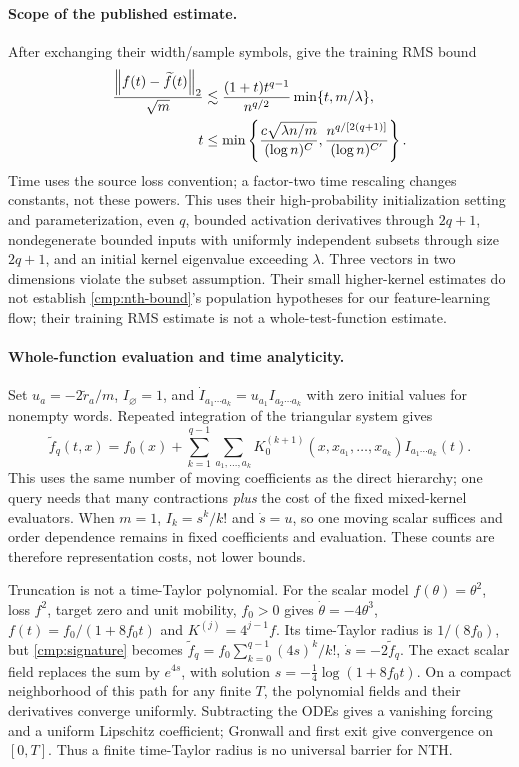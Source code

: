 \paragraph{Scope of the published estimate.}
After exchanging their width/sample symbols, \citet[Theorem~2.6]{huang2020nth}
give the training RMS bound
\begin{align}
 \frac{\left\lVert f(t)-\widetilde f(t)\right\rVert_2}{\sqrt m}
 &\lesssim\frac{(1+t)t^{q-1}}{n^{q/2}}\min\{t,m/\lambda\},\nonumber\\
 t&\le\min\left\{\frac{c\sqrt{\lambda n/m}}{(\log n)^C},
 \frac{n^{q/[2(q+1)]}}{(\log n)^{C'}}\right\}.
\label{cmp:published-nth}
\end{align}
Time uses the source loss convention; a factor-two time rescaling changes
constants, not these powers.
This uses their high-probability initialization setting and parameterization,
even $q$, bounded
activation derivatives through $2q+1$, nondegenerate bounded inputs with
uniformly independent subsets through size $2q+1$, and an initial kernel
eigenvalue exceeding $\lambda$.  Three vectors in two dimensions violate the
subset assumption.  Their small higher-kernel estimates do not establish
\eqref{cmp:nth-bound}'s population hypotheses for our feature-learning flow;
their training RMS estimate is not a whole-test-function estimate.

\paragraph{Whole-function evaluation and time analyticity.}
Set $u_a=-2\widetilde r_a/m$, $I_\varnothing=1$, and
$\dot I_{a_1\cdots a_k}=u_{a_1}I_{a_2\cdots a_k}$ with zero initial values
for nonempty words.  Repeated integration of the triangular system gives
\begin{equation}
 \widetilde f_q(t,x)=f_0(x)+\sum_{k=1}^{q-1}\sum_{a_1,\ldots,a_k}
 K_0^{(k+1)}(x,x_{a_1},\ldots,x_{a_k})I_{a_1\cdots a_k}(t).
 \label{cmp:signature}
\end{equation}
This uses the same number of moving coefficients as the direct hierarchy;
one query needs that many contractions \emph{plus} the cost of the fixed
mixed-kernel evaluators.  When $m=1$, $I_k=s^k/k!$ and $\dot s=u$, so one
moving scalar suffices and order dependence remains in fixed coefficients
and evaluation.  These counts are therefore representation costs, not lower bounds.

Truncation is not a time-Taylor polynomial.  For the scalar model
$f(\theta)=\theta^2$, loss $f^2$, target zero and unit mobility,
$f_0>0$ gives $\dot\theta=-4\theta^3$, $f(t)=f_0/(1+8f_0t)$ and
$K^{(j)}=4^{j-1}f$.  Its time-Taylor radius is $1/(8f_0)$, but
\eqref{cmp:signature} becomes
$\widetilde f_q=f_0\sum_{k=0}^{q-1}(4s)^k/k!$, $\dot s=-2\widetilde f_q$.
The exact scalar field replaces the sum by $e^{4s}$, with solution
$s=-\tfrac14\log(1+8f_0t)$.  On a compact neighborhood of this path for any
finite $T$, the polynomial fields and their derivatives converge uniformly.
Subtracting the ODEs gives a vanishing forcing and a uniform Lipschitz
coefficient; Gronwall and first exit give convergence on $[0,T]$.
Thus a finite time-Taylor radius is no universal barrier for NTH.

